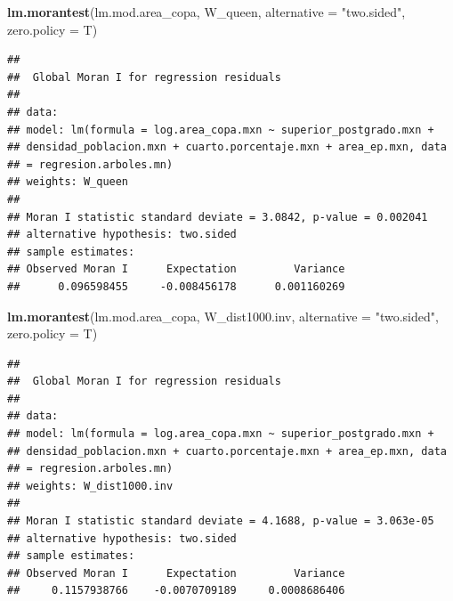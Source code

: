 \documentclass[12pt,]{book}
\newenvironment{Shaded}{\begin{snugshade}}{\end{snugshade}}
\newcommand{\KeywordTok}[1]{\textcolor[rgb]{0.13,0.29,0.53}{\textbf{#1}}}
\newcommand{\DataTypeTok}[1]{\textcolor[rgb]{0.13,0.29,0.53}{#1}}
\newcommand{\StringTok}[1]{\textcolor[rgb]{0.31,0.60,0.02}{#1}}
\newcommand{\NormalTok}[1]{#1}
\begin{document}
\begin{Shaded}
\begin{Highlighting}[]
\KeywordTok{lm.morantest}\NormalTok{(lm.mod.area_copa, W_queen, }\DataTypeTok{alternative =} \StringTok{"two.sided"}\NormalTok{, }\DataTypeTok{zero.policy =}\NormalTok{ T)}
\end{Highlighting}
\end{Shaded}

\begin{verbatim}
## 
##  Global Moran I for regression residuals
## 
## data:  
## model: lm(formula = log.area_copa.mxn ~ superior_postgrado.mxn +
## densidad_poblacion.mxn + cuarto.porcentaje.mxn + area_ep.mxn, data
## = regresion.arboles.mn)
## weights: W_queen
## 
## Moran I statistic standard deviate = 3.0842, p-value = 0.002041
## alternative hypothesis: two.sided
## sample estimates:
## Observed Moran I      Expectation         Variance 
##      0.096598455     -0.008456178      0.001160269
\end{verbatim}

\begin{Shaded}
\begin{Highlighting}[]
\KeywordTok{lm.morantest}\NormalTok{(lm.mod.area_copa, W_dist1000.inv, }\DataTypeTok{alternative =} \StringTok{"two.sided"}\NormalTok{, }\DataTypeTok{zero.policy =}\NormalTok{ T)}
\end{Highlighting}
\end{Shaded}

\begin{verbatim}
## 
##  Global Moran I for regression residuals
## 
## data:  
## model: lm(formula = log.area_copa.mxn ~ superior_postgrado.mxn +
## densidad_poblacion.mxn + cuarto.porcentaje.mxn + area_ep.mxn, data
## = regresion.arboles.mn)
## weights: W_dist1000.inv
## 
## Moran I statistic standard deviate = 4.1688, p-value = 3.063e-05
## alternative hypothesis: two.sided
## sample estimates:
## Observed Moran I      Expectation         Variance 
##     0.1157938766    -0.0070709189     0.0008686406
\end{verbatim}
\end{document}
